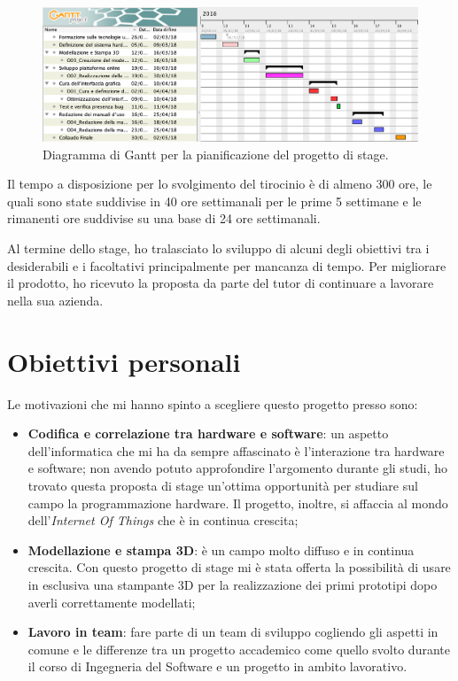 \begin{figure}[H]
	\begin{center}
	\includegraphics[scale=0.4]{immagini/gantt.png}
	\caption{Diagramma di Gantt per la pianificazione del progetto di stage.}
	\end{center}
\end{figure}

Il tempo a disposizione per lo svolgimento del tirocinio è di almeno 300 ore, le quali sono state suddivise in 40 ore settimanali per le prime 5 settimane e le rimanenti ore suddivise su una base di 24 ore settimanali.

\medskip

Al termine dello stage, ho tralasciato lo sviluppo di alcuni degli obiettivi tra i desiderabili e i facoltativi principalmente per mancanza di tempo.
Per migliorare il prodotto, ho ricevuto la proposta da parte del tutor di continuare a lavorare nella sua azienda.

\section{Obiettivi personali}
Le motivazioni che mi hanno spinto a scegliere questo progetto presso \lab{} sono:

\begin{itemize}
\item \textbf{Codifica e correlazione tra hardware e software}: un aspetto dell'informatica che mi ha da sempre affascinato è l'interazione tra hardware e software; non avendo potuto approfondire l'argomento durante gli studi, ho trovato questa proposta di stage un'ottima opportunità per studiare sul campo la programmazione hardware. Il progetto, inoltre, si affaccia al mondo dell'\textit{Internet Of Things} che è in continua crescita;
\item \textbf{Modellazione e stampa 3D}: è un campo molto diffuso e in continua crescita. Con questo progetto di stage mi è stata offerta la possibilità di usare in esclusiva una stampante 3D per la realizzazione dei primi prototipi dopo averli correttamente modellati;
\item \textbf{Lavoro in team}: fare parte di un team di sviluppo cogliendo gli aspetti in comune e le differenze tra un progetto accademico come quello svolto durante il corso di Ingegneria del Software e un progetto in ambito lavorativo. 
\end{itemize}

